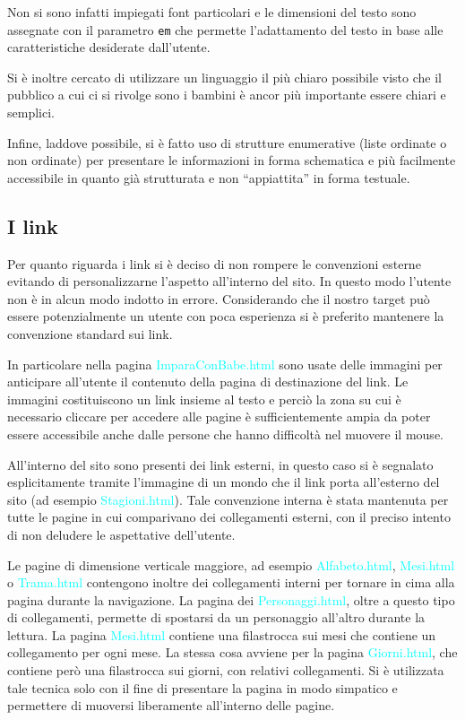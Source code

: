 \documentclass[10pt,a4paper,onecolumn]{article}
\newcommand{\sitepage}[1]{\textcolor{cyan}{\textsf{#1}}}
\begin{document}
Non si sono infatti impiegati font particolari e le dimensioni del testo sono assegnate con il parametro \texttt{em} che permette l'adattamento del testo in base alle caratteristiche desiderate dall'utente.  

Si è inoltre cercato di utilizzare un linguaggio il più chiaro possibile visto che il pubblico a cui ci si rivolge sono i bambini è ancor più importante essere chiari e semplici.

Infine, laddove possibile, si è fatto uso di strutture enumerative (liste ordinate o non ordinate) per presentare le informazioni in forma schematica e più facilmente accessibile in quanto già strutturata e non ``appiattita'' in forma testuale.

\subsection{I link}
Per quanto riguarda i link si è deciso di non rompere le convenzioni esterne evitando di personalizzarne l'aspetto all'interno del sito.
In questo modo l'utente non è in alcun modo indotto in errore. Considerando che il nostro target può essere potenzialmente un utente con poca esperienza si è preferito mantenere la convenzione standard sui link.

In particolare nella pagina \sitepage{ImparaConBabe.html} sono usate delle immagini per anticipare all'utente il contenuto della pagina di destinazione del link.
Le immagini costituiscono un link insieme al testo  e perciò la zona su cui è necessario cliccare per accedere alle pagine è sufficientemente ampia da poter essere accessibile anche dalle persone che hanno difficoltà nel muovere il mouse.

All'interno del sito sono presenti dei link esterni, in questo caso si è segnalato esplicitamente tramite l'immagine di un mondo che il link porta all'esterno del sito (ad esempio \sitepage{Stagioni.html}). Tale convenzione interna è stata mantenuta per tutte le pagine in cui comparivano dei collegamenti esterni, con il preciso intento di non deludere le aspettative dell'utente.

Le pagine di dimensione verticale maggiore, ad esempio \sitepage{Alfabeto.html}, \sitepage{Mesi.html} o \sitepage{Trama.html} contengono inoltre dei collegamenti interni per tornare in cima alla pagina durante la navigazione. La pagina dei \sitepage{Personaggi.html}, oltre a questo tipo di collegamenti, permette di spostarsi da un personaggio all'altro durante la lettura. La pagina \sitepage{Mesi.html} contiene una filastrocca sui mesi che contiene un collegamento per ogni mese. La stessa cosa avviene per la pagina \sitepage{Giorni.html}, che contiene però una filastrocca sui giorni, con relativi collegamenti. Si è utilizzata tale tecnica solo con il fine di presentare la pagina in modo simpatico e permettere di muoversi liberamente all'interno delle pagine.
\end{document}
